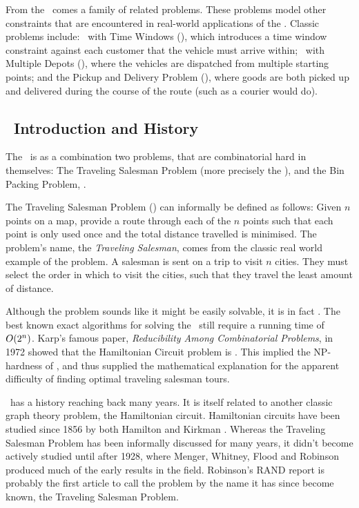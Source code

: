 From the \VRP\ comes a family of related problems. These problems model other constraints that are encountered in real-world applications of the \VRP. Classic problems include: \VRP\ with Time Windows (\VRPTW), which introduces a time window constraint against each customer that the vehicle must arrive within; \VRP\ with Multiple Depots (\MDVRP), where the vehicles are dispatched from multiple starting points; and the Pickup and Delivery Problem (\PDP), where goods are both picked up and delivered during the course of the route (such as a courier would do).

\subsection{\TSP\ Introduction and History}
\label{sec:tiah}

The \VRP\ is as a combination two problems, that are combinatorial hard in themselves: The Traveling Salesman Problem (more precisely the \MTSP), and the Bin Packing Problem, \BPP.

The Traveling Salesman Problem (\TSP) can informally be defined as follows: Given $n$ points on a map, provide a route through each of the $n$ points such that each point is only used once and the total distance travelled is minimised. The problem's name, the \emph{Traveling Salesman}, comes from the classic real world example of the problem. A salesman is sent on a trip to visit $n$ cities. They must select the order in which to visit the cities, such that they travel the least amount of distance.

Although the problem sounds like it might be easily solvable, it is in fact \nphard. The best known exact algorithms for solving the \TSP\ still require a running time of $\mbox{$O(2^n)$}$. Karp's famous paper, \emph{Reducibility Among Combinatorial Problems}\cite{Kar72}, in 1972 showed that the Hamiltonian Circuit problem is \npcomplete. This implied the NP-hardness of \TSP, and thus supplied the mathematical explanation for the apparent difficulty of finding optimal traveling salesman tours. 


\TSP\ has a history reaching back many years. It is itself related to another classic graph theory problem, the Hamiltonian circuit. Hamiltonian circuits have been studied since 1856 by both Hamilton \cite{Hamilton:1856} and Kirkman \cite{Kirkman:1856}. Whereas the Traveling Salesman Problem has been informally discussed for many years\cite{Schrijver}, it didn't become actively studied until after 1928, where Menger, Whitney, Flood and Robinson produced much of the early results in the field. Robinson's RAND report\cite{Robinson:1949} is probably the first article to call the problem by the name it has since become known, the Traveling Salesman Problem. 

